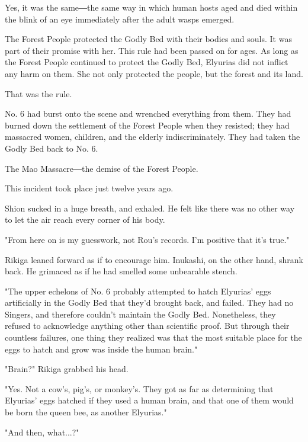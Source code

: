 Yes, it was the same―the same way in which human hosts aged and died
within the blink of an eye immediately after the adult wasps emerged.

The Forest People protected the Godly Bed with their bodies and souls.
It was part of their promise with her. This rule had been passed on for
ages. As long as the Forest People continued to protect the Godly Bed,
Elyurias did not inflict any harm on them. She not only protected the
people, but the forest and its land.

That was the rule.

No. 6 had burst onto the scene and wrenched everything from them. They
had burned down the settlement of the Forest People when they resisted;
they had massacred women, children, and the elderly indiscriminately.
They had taken the Godly Bed back to No. 6.

The Mao Massacre―the demise of the Forest People.

This incident took place just twelve years ago.

Shion sucked in a huge breath, and exhaled. He felt like there was no
other way to let the air reach every corner of his body.

"From here on is my guesswork, not Rou's records. I'm positive that it's
true."

Rikiga leaned forward as if to encourage him. Inukashi, on the other
hand, shrank back. He grimaced as if he had smelled some unbearable
stench.

"The upper echelons of No. 6 probably attempted to hatch Elyurias' eggs
artificially in the Godly Bed that they'd brought back, and failed. They
had no Singers, and therefore couldn't maintain the Godly Bed.
Nonetheless, they refused to acknowledge anything other than scientific
proof. But through their countless failures, one thing they realized was
that the most suitable place for the eggs to hatch and grow was inside
the human brain."

"Brain?" Rikiga grabbed his head.

"Yes. Not a cow's, pig's, or monkey's. They got as far as determining
that Elyurias' eggs hatched if they used a human brain, and that one of
them would be born the queen bee, as another Elyurias."

"And then, what...?"

